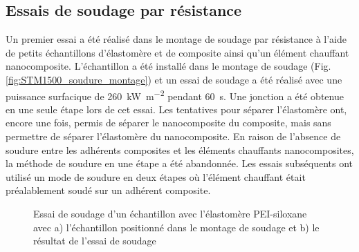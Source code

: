 \FloatBarrier

\subsection{Essais de soudage par résistance}

Un premier essai a été réalisé dans le montage de soudage par résistance à l'aide de petits échantillons d'élastomère et de composite ainsi qu'un élément chauffant nanocomposite. 
L'échantillon a été installé dans le montage de soudage (Fig. \ref{fig:STM1500_soudure_montage}) et un essai de soudage a été réalisé avec une puissance surfacique de \SI[locale=FR]{260}{\kilo\watt\per\square\metre} pendant \SI[locale=FR]{60}{\second}. 
Une jonction a été obtenue en une seule étape lors de cet essai. 
Les tentatives pour séparer l'élastomère ont, encore une fois, permis de séparer le nanocomposite du composite, mais sans permettre de séparer l'élastomère du nanocomposite. 
En raison de l'absence de soudure entre les adhérents composites et les éléments chauffants nanocomposites, la méthode de soudure en une étape a été abandonnée.
Les essais subséquents ont utilisé un mode de soudure en deux étapes où l'élément chauffant était préalablement soudé sur un adhérent composite. 

\FloatBarrier
\begin{figure}[h]
	\centering
	 \qquad
	\caption{Essai de soudage d'un échantillon avec l'élastomère PEI-siloxane avec a) l'échantillon positionné dans le montage de soudage et b) le résultat de l'essai de soudage}
	\label{fig:STM1500_soudure}
\end{figure}
\FloatBarrier


